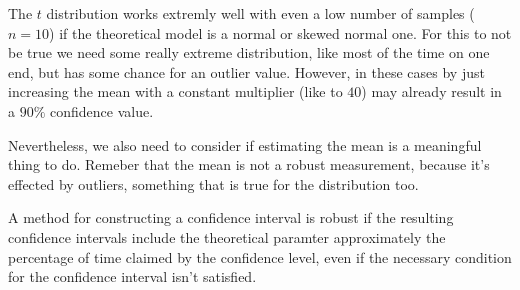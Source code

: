The $t$ distribution works extremly well with even a low number of samples ($n
=10$) if the theoretical model is a normal or skewed normal one. For this to not
be true we need some really extreme distribution, like most of the time on one
end, but has some chance for an outlier value. However, in these cases by just
increasing the mean with a constant multiplier (like to $40$) may already result
in a $90\%$ confidence value.

Nevertheless, we also need to consider if estimating the mean is a meaningful
thing to do. Remeber that the mean is not a robust measurement, because it's
effected by outliers, something that is true for the distribution too.

A method for constructing a confidence interval is robust if the resulting
confidence intervals include the theoretical paramter approximately the
percentage of time claimed by the confidence level, even if the necessary
condition for the confidence interval isn't satisfied.
